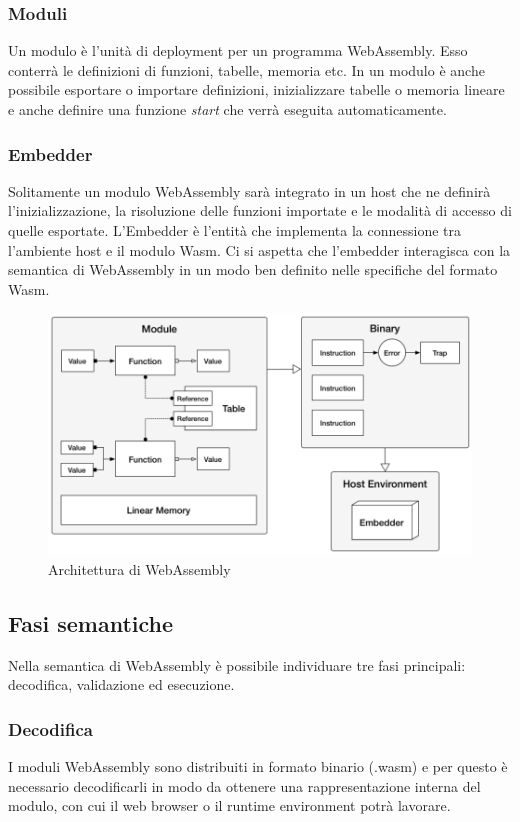 \subsubsection{Moduli}
Un modulo è l'unità di deployment per un programma WebAssembly. Esso conterrà le definizioni di funzioni, tabelle, memoria etc. In un modulo è anche possibile esportare o importare definizioni, inizializzare tabelle o memoria lineare e anche definire una funzione \emph{start} che verrà eseguita automaticamente. 
\subsubsection{Embedder}
Solitamente un modulo WebAssembly sarà integrato in un host che ne definirà l'inizializzazione, la risoluzione delle funzioni importate  e le modalità di accesso di quelle esportate. L'Embedder è l'entità che implementa la connessione tra l'ambiente host e il modulo Wasm. Ci si aspetta che l'embedder interagisca con la semantica di WebAssembly in un modo ben definito nelle specifiche del formato Wasm.
\begin{figure}
        \begin{center}
                \includegraphics[width=0.9\columnwidth]{images/wasmArchitecture.png}
        \end{center}
        \caption{Architettura di WebAssembly}
        \label{fig:wasmArch}
\end{figure}
\newpage
\subsection{Fasi semantiche}
Nella semantica di WebAssembly è possibile individuare tre fasi principali: decodifica, validazione ed esecuzione.\cite*{wasmSpec}
\subsubsection{Decodifica}
I moduli WebAssembly sono distribuiti in formato binario (.wasm) e per questo è necessario decodificarli in modo da ottenere una rappresentazione interna del modulo, con cui il web browser o il runtime environment potrà lavorare.
